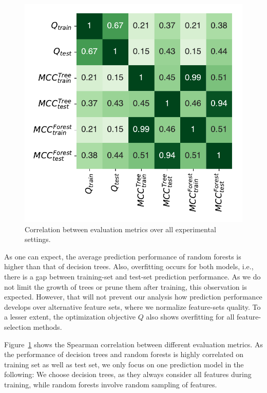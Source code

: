 \documentclass[conference]{IEEEtran}
\theoremstyle{definition}
\begin{document}
\begin{figure}[t]
	\centering
	\includegraphics[width=\columnwidth]{plots/evaluation-metrics-correlation.pdf}
	\caption{Correlation between evaluation metrics over all experimental settings.}
	\label{fig:evaluation-metrics-correlation}
\end{figure}

As one can expect, the average prediction performance of random forests is higher than that of decision trees.
Also, overfitting occurs for both models, i.e., there is a gap between training-set and test-set prediction performance.
As we do not limit the growth of trees or prune them after training, this observation is expected.
However, that will not prevent our analysis how prediction performance develops over alternative feature sets, where we normalize feature-sets quality.
To a lesser extent, the optimization objective $Q$ also shows overfitting for all feature-selection methods.

Figure~\ref{fig:evaluation-metrics-correlation} shows the Spearman correlation between different evaluation metrics.
As the performance of decision trees and random forests is highly correlated on training set as well as test set, we only focus on one prediction model in the following:
We choose decision trees, as they always consider all features during training, while random forests involve random sampling of features.
\end{document}
